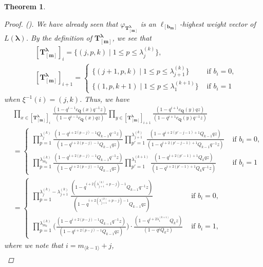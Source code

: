 \documentclass[12pt]{amsart}
\newtheorem{thm}{Theorem}[section]
\numberwithin{equation}{thm}
\newcommand\bQ{\mathbf Q}
\newcommand\bT{\mathbf T}
\newcommand\bb{\mathbf b}
\renewcommand\bm{\mathbf m} %
\newcommand\la{\lambda}
\newcommand\vf{\varphi}
\newcommand\Bla{\boldsymbol\lambda}
\newcommand{\dis}{\displaystyle}
\newcommand\lan{\langle}
\newcommand\ran{\rangle}
\newcounter{ni}
\newcommand{\roii}{\roman{ni}}
\begin{document}
\begin{thm}
\begin{proof}
(\roii). 
We have already seen that $\vf_{\bT^{\Bla}_{[\bm]}}$ is an $\ell_{[\bb_{\bm}]}$-highest weight vector of $L(\Bla)$. 
By the definition of $\bT_{[\bm]}^{\Bla}$, we see that 
\begin{align*}
&[\bT^{\Bla}_{[\bm]}]_i= \{ (j, p, k) \mid 1 \leq p \leq \la_j^{(k)} \},  
\\
& [\bT^{\Bla}_{[\bm]}]_{i+1} = 
	\begin{cases}
	\{ (j+1, p , k) \mid 1 \leq p \leq \la_{j+1}^{(k)}\} & \text{ if } b_i=0, 
	\\ 
	\{(1, p ,k+1) \mid 1 \leq p \leq \la_1^{(k+1)}\} & \text{ if } b_i=1 
	\end{cases}
\end{align*}
when $\xi^{-1} (i) = (j,k)$. 
Thus, we have 
\begin{align*}
&\prod_{x \in [\bT^{\Bla}_{[\bm]}]_i} \frac{(1 - q^{i-1} c_{\bQ}(x) q^{-1} z)}{ (1 - q^{i-1} c_{\bQ} (x) q z)} 
	\prod_{y \in [\bT^{\Bla}_{[\bm]}]_{i+1}} \frac{ (1 - q^{i+1} c_{\bQ} (y) q z ) }{ (1 - q^{i+1} c_{\bQ} (y) q^{-1} z)}  
\\
&= \begin{cases}
	\dis 
	\prod_{p=1}^{\la_j^{(k)} } \frac{ (1 - q^{i + 2 (p-j)-1} Q_{k-1} q^{-1} z)}{ (1 - q^{i +2 (p-j) -1} Q_{k-1}  q z )} 
		\prod_{p'=1}^{\la_{j+1}^{(k)}} \frac{ (1 - q^{i+ 2 (p'- j-1) +1} Q_{k-1} q z)}{ (1 - q^{ i+ 2 (p'-j-1) +1} Q_{k-1} q^{-1} z)} 
		& \text{ if } b_i=0, 
	 \\ \dis 
	 \prod_{p=1}^{\la_{m_k}^{(k)} } \frac{ (1 - q^{i + 2 (p-j)-1} Q_{k-1} q^{-1} z)}{ (1 - q^{i +2 (p-j) -1} Q_{k-1}  q z )} 
	 \prod_{p'=1}^{\la_1^{(k+1)}} \frac{(1 - q^{i + 2 (p' - 1) +1} Q_k q  z)}{ ( 1 - q^{i+ 2 (p' - 1) +1} Q_k q^{-1} z)} 
	 & \text{ if } b_i=1 
	 \end{cases}
\\
&= \begin{cases}
	\dis 
	\prod_{p=1}^{\la_j^{(k)} - \la_{j+1}^{(k)}} 
		\frac{ ( 1 - q^{i+ 2 (\la_{j+1}^{(k)} +p -j)-1} Q_{k-1} q^{-1} z)}{(1 - q^{i + 2 (\la_{j+1}^{(k)} +p -j) -1} Q_{k-1} q z)} 
		& \text{ if } b_i=0,  
	\\ \dis 
	\prod_{p=1}^{\la_{m_k}^{(k)} } \Big( \frac{ (1 - q^{i + 2 (p-j)-1} Q_{k-1} q^{-1} z)}{ (1 - q^{i +2 (p-j) -1} Q_{k-1}  q z )} \Big)  
		\cdot \frac{(1 - q^{i + 2 \la_1^{(k+1)} } Q_k z)}{ (1 - q^i Q_k z)} 
		& \text{ if } b_i=1, 
	\end{cases}
\end{align*}
where we note that 
$i = m_{\lan k-1 \ran} +j$, 
\begin{align*}

\end{align*}
\end{proof}
\end{thm}
\end{document}
